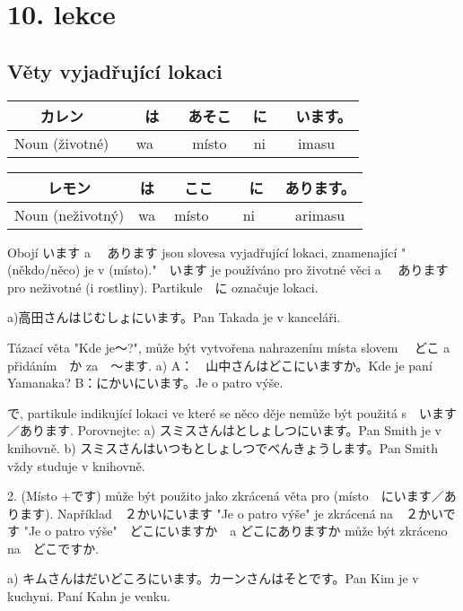 \section{10. lekce}
\label{sec:lekce_10}
\subsection{Věty vyjadřující lokaci}
\begin{center}
\begin{tabular}{|c|c|c|c|c|}
\hline
カレン&　は　&あそこ　&に&　います。\\
\hline
Noun (životné) &wa&místo&ni&imasu\\
\hline
\end{tabular}
\end{center}


\begin{center}
\begin{tabular}{|c|c|c|c|c|}
\hline
レモン　&は&　ここ&　に　&あります。\\
\hline
Noun (neživotný)&wa&místo&ni&arimasu\\
\hline
\end{tabular}
\end{center}

Obojí います a 　あります jsou slovesa vyjadřující lokaci, znamenající "(někdo/něco) je v (místo)."　います je používáno pro životné věci a 　あります pro neživotné (i rostliny). Partikule　に označuje lokaci.

a)高田さんはじむしょにいます。Pan Takada je v kanceláři.


Tázací věta "Kde je〜?", může být vytvořena nahrazením místa slovem 　どこ a přidáním　か za　〜ます.
a)
A：　山中さんはどこにいますか。Kde je paní Yamanaka?
B：にかいにいます。Je o patro výše.

で, partikule indikující lokaci ve které se něco děje nemůže být použitá s　います／あります.
Porovnejte:
a) スミスさんはとしょしつにいます。Pan Smith je v knihovně.
b) スミスさんはいつもとしょしつでべんきょうします。Pan Smith vždy studuje v knihovně.

2. (Místo +です) může být použito jako zkrácená věta pro (místo　にいます／あります). Například　２かいにいます "Je o patro výše" je zkrácená na　２かいです "Je o patro výše"　どこにいますか　a どこにありますか může být zkráceno na　どこですか.

a) キムさんはだいどころにいます。カーンさんはそとです。Pan Kim je v kuchyni. Paní Kahn je venku.

